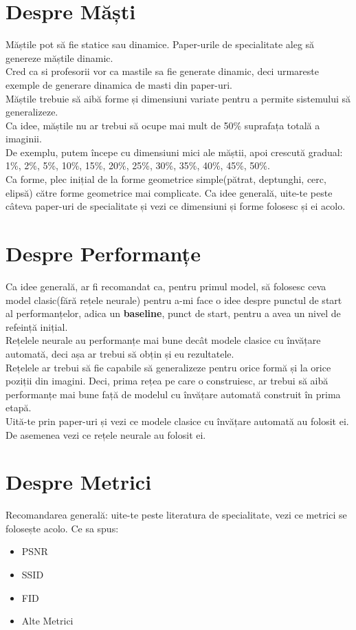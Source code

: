 \documentclass[12pt, a4paper]{article}
\begin{document}
\section{Despre Măști}
Măștile pot să fie statice sau dinamice. Paper-urile de specialitate aleg să genereze măștile dinamic.\\
Cred ca si profesorii vor ca mastile sa fie generate dinamic, deci urmareste exemple de generare dinamica de masti din paper-uri.\\
Măștile trebuie să aibă forme și dimensiuni variate pentru a permite sistemului să generalizeze.\\
Ca idee, măștile nu ar trebui să ocupe mai mult de 50\% suprafața totală a imaginii.\\
De exemplu, putem începe cu dimensiuni mici ale măștii, apoi crescută gradual: 1\%, 2\%, 5\%, 10\%, 15\%, 20\%, 25\%, 30\%, 35\%, 40\%, 45\%, 50\%.\\
Ca forme, plec inițial de la forme geometrice simple(pătrat, deptunghi, cerc, elipsă) către forme geometrice mai complicate.
Ca idee generală, uite-te peste câteva paper-uri de specialitate și vezi ce dimensiuni și forme folosesc și ei acolo.


\section{Despre Performanțe}
Ca idee generală, ar fi recomandat ca, pentru primul model, să folosesc ceva model clasic(fără rețele neurale) pentru a-mi face o idee despre punctul de start al performanțelor, adica un \textbf{baseline}, punct de start, pentru a avea un nivel de refeință inițial.\\
Rețelele neurale au performanțe mai bune decât modele clasice cu învățare automată, deci așa ar trebui să obțin și eu rezultatele.\\
Rețelele ar trebui să fie capabile să generalizeze pentru orice formă și la orice poziții din imagini.
Deci, prima rețea pe care o construiesc, ar trebui să aibă performanțe mai bune față de modelul cu învățare automată construit în prima etapă. \\
Uită-te prin paper-uri și vezi ce modele clasice cu învățare automată au folosit ei. De asemenea vezi ce rețele neurale au folosit ei.

\section{Despre Metrici}
Recomandarea generală: uite-te peste literatura de specialitate, vezi ce metrici se folosește acolo.
Ce sa spus:
\begin{itemize}
    \item PSNR
    \item SSID
    \item FID
    \item Alte Metrici
\end{itemize}
\end{document}
